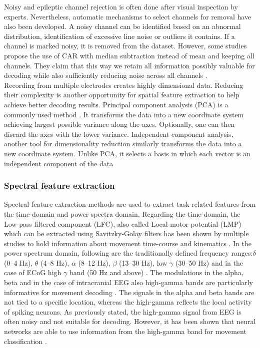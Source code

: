 Noisy and epileptic channel rejection is often done after visual inspection by experts. Nevertheless, automatic mechanisms to select channels for removal have also been developed. A noisy channel can be identified based on an abnormal distribution, identification of excessive line noise or outliers it contains. If a channel is marked noisy, it is removed from the dataset. However, some studies propose the use of CAR with median subtraction instead of mean and keeping all channels. They claim that this way we retain all information possibly valuable for decoding while also sufficiently reducing noise across all channels \cite{liu-effects-2015}. \\

Recording from multiple electrodes creates highly dimensional data. Reducing their complexity is another opportunity for spatial feature extraction to help achieve better decoding results. Principal component analysis (PCA) is a commonly used method \cite{}. It transforms the data into a new coordinate system achieving largest possible variance along the axes. Optionally, one can then discard the axes with the lower variance. Independent component analysis, another tool for dimensionality reduction similarly transforms the data into a new coordinate system. Unlike PCA, it selects a basis in which each vector is an independent component of the data \cite{ica}

\subsubsection{Spectral feature extraction}
Spectral feature extraction methods are used to extract task-related features from the time-domain and power spectra domain. Regarding the time-domain, the Low-pass filtered component (LFC), also called Local motor potential (LMP) which can be extracted using Savitzky-Golay filters \cite{multitaper-31} has been shown by multiple studies to hold information about movement time-course and kinematics \cite{schalk-2007, Pistohl2008PredictionOA, ball-2019}. In the power spectrum domain, following are the traditionally defined frequency ranges:$\delta$ (0–4 Hz), $\theta$ (4–8 Hz), $\alpha$ (8–12 Hz), $\beta$ (13–30 Hz), low $\gamma$ (30–50 Hz) and in the case of ECoG high $\gamma$ band (50 Hz and above) \cite{hammer-predominance-2016}. The modulations in the alpha, beta and in the case of intracranial EEG also high-gamma bands are particularly informative for movement decoding \cite{ball-hg-importance, 34-gunduz-hg}. The signals in the alpha and beta bands are not tied to a specific location, whereas the high-gamma reflects the local activity of spiking neurons. As previously stated, the high-gamma signal from EEG is often noisy and not suitable for decoding. However, it has been shown that neural networks are able to use information from the high-gamma band for movement classification \cite{schirrmeister-deep-2017}.  \\


